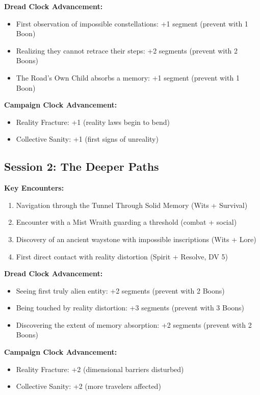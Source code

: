 \documentclass[11pt]{article}
\begin{document}
\textbf{Dread Clock Advancement:}
\begin{itemize}
\item First observation of impossible constellations: +1 segment (prevent with 1 Boon)
\item Realizing they cannot retrace their steps: +2 segments (prevent with 2 Boons)
\item The Road's Own Child absorbs a memory: +1 segment (prevent with 1 Boon)
\end{itemize}

\textbf{Campaign Clock Advancement:}
\begin{itemize}
\item Reality Fracture: +1 (reality laws begin to bend)
\item Collective Sanity: +1 (first signs of unreality)
\end{itemize}

\subsection{Session 2: The Deeper Paths}

\textbf{Key Encounters:}
\begin{enumerate}
\item Navigation through the Tunnel Through Solid Memory (Wits + Survival)
\item Encounter with a Mist Wraith guarding a threshold (combat + social)
\item Discovery of an ancient waystone with impossible inscriptions (Wits + Lore)
\item First direct contact with reality distortion (Spirit + Resolve, DV 5)
\end{enumerate}

\textbf{Dread Clock Advancement:}
\begin{itemize}
\item Seeing first truly alien entity: +2 segments (prevent with 2 Boons)
\item Being touched by reality distortion: +3 segments (prevent with 3 Boons)
\item Discovering the extent of memory absorption: +2 segments (prevent with 2 Boons)
\end{itemize}

\textbf{Campaign Clock Advancement:}
\begin{itemize}
\item Reality Fracture: +2 (dimensional barriers disturbed)
\item Collective Sanity: +2 (more travelers affected)
\end{itemize}
\end{document}
